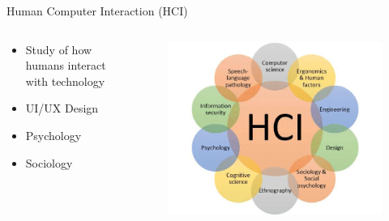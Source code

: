 \documentclass{beamer}
\begin{document}
\begin{frame}{Human Computer Interaction (HCI)}
\begin{columns}
	\begin{column}{.45\textwidth}
		\begin{itemize}
			\item Study of how humans interact with technology
			\item UI/UX  Design
			\item Psychology
			\item Sociology
		\end{itemize}
	\end{column}
	\begin{column}{.55\textwidth}
		\begin{figure}
			\includegraphics[width=\linewidth]{img/hci.png}
		\end{figure}
	\end{column}
\end{columns}
\end{frame}
\end{document}
